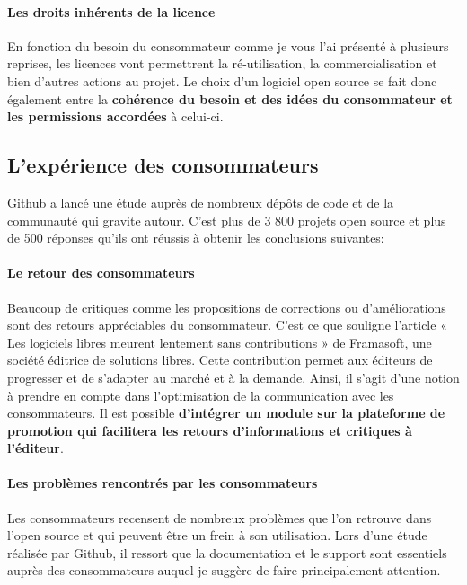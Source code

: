 			\paragraph{Les droits inhérents de la licence\\}

			En fonction du besoin du consommateur comme je vous l'ai présenté à plusieurs reprises, les licences vont permettrent la ré-utilisation, la commercialisation et bien d'autres actions au projet. Le choix d'un logiciel open source se fait donc également entre la \textbf{cohérence du besoin et des idées du consommateur et les permissions accordées} à celui-ci.

		\subsection{L'expérience des consommateurs}

			Github a lancé une étude auprès de nombreux dépôts de code et de la communauté qui gravite autour. C'est plus de 3 800 projets open source et plus de 500 réponses qu'ils ont réussis à obtenir les conclusions suivantes:

			\paragraph{Le retour des consommateurs \\}

				Beaucoup de critiques comme les propositions de corrections ou d'améliorations sont des retours appréciables du consommateur. C'est ce que souligne l'article « Les logiciels libres meurent lentement sans contributions » de Framasoft, une société éditrice de solutions libres.
				Cette contribution permet aux éditeurs de progresser et de s'adapter au marché et à la demande.
				Ainsi, il s'agit d'une notion à prendre en compte dans l'optimisation de la communication avec les consommateurs. Il est possible \textbf{d'intégrer un module sur la plateforme de promotion qui facilitera les retours d'informations et critiques à l'éditeur}.

			\paragraph{Les problèmes rencontrés par les consommateurs\\}

				Les consommateurs recensent de nombreux problèmes que l'on retrouve dans l'open source et qui peuvent être un frein à son utilisation. Lors d'une étude réalisée par Github, il ressort que la documentation et le support sont essentiels auprès des consommateurs auquel je suggère de faire principalement attention.

